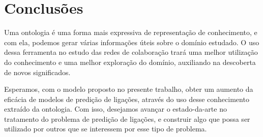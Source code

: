 \chapter{Conclusões}
\label{cap:conclusoes}

Uma ontologia é uma forma mais expressiva de representação de conhecimento, e com ela, podemos gerar várias informações úteis sobre o domínio estudado. O uso dessa ferramenta no estudo das redes de colaboração trará uma melhor utilização do conhecimento e uma melhor exploração do domínio, auxiliando na descoberta de novos significados.

Esperamos, com o modelo proposto no presente trabalho, obter um aumento da eficácia de modelos de predição de ligações, através do uso desse conhecimento extraído da ontologia. Com isso, desejamos avançar o estado-da-arte no tratamento do problema de predição de ligações, e construir algo que possa ser utilizado por outros que se interessem por esse tipo de problema.
